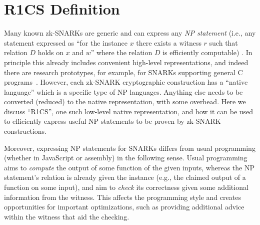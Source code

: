 \section{R1CS Definition}\label{sec:r1cs-def}

Many known zk-SNARKs are generic and can express any \emph{NP statement} (i.e., any statement expressed as ``for the instance $x$ there exists a witness $r$ such that relation $D$ holds on $x$ and $w$'' where the relation $D$ is efficiently computable) \cite{ZKProofSecurity}. In principle this already includes convenient high-level representations, and indeed there are research prototypes, for example, for SNARKs supporting general C programs~\cite{BCGTV13csnark-crypto}. However, each zk-SNARK cryptographic construction has a ``native language'' which is a specific type of NP languages. Anything else needs to be converted (reduced) to the native representation, with some overhead. Here we discuss ``R1CS'', one such low-level native representation, and how it can be used to efficiently express useful NP statements to be proven by zk-SNARK constructions.

Moreover, expressing NP statements for SNARKs differs from usual programming (whether in JavaScript or assembly) in the following sense. Usual programming aims to \emph{compute} the output of some function of the given inputs, whereas the NP statement's relation is already given the instance (e.g., the claimed output of a function on some input), and aim to \emph{check} its correctness given some additional information from the witness. This affects the programming style and creates opportunities for important optimizations, such as providing additional advice within the witness that aid the checking.


